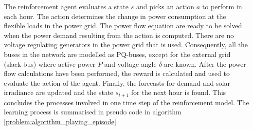 \documentclass[class=book, crop=false]{standalone}
\begin{document}
The reinforcement agent evaluates a state $s$ and picks an action $a$ to perform in each hour. The action determines the change in power consumption at the flexible loads in the power grid. The power flow equation are ready to be solved when the power demand resulting from the action is computed. There are no voltage regulating generators in the power grid that is used. Consequently, all the buses in the network are modelled as PQ-buses, except for the external grid (slack bus) where active power $P$ and voltage angle $\delta$ are known. After the power flow calculations have been performed, the reward is calculated and used to evaluate the action of the agent. Finally, the forecasts for demand and solar irradiance are updated and the state $s_{t+1}$ for the next hour is found. This concludes the processes involved in one time step of the reinforcement model. The learning process is summarised in pseudo code in algorithm \ref{problem:algorithm_playing_episode} 
\end{document}
